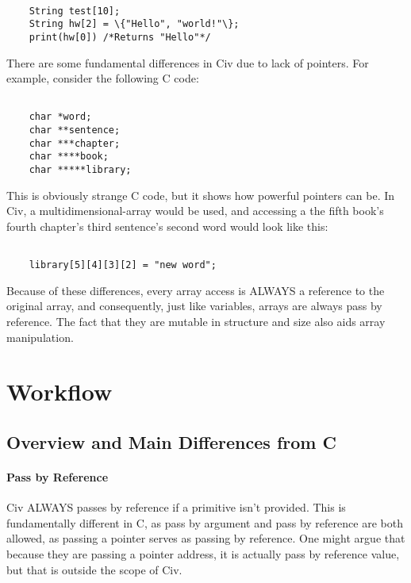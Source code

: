 \documentclass[a4paper]{article}
\begin{document}
{\selectfont
\begin{lstlisting}

	String test[10];
	String hw[2] = \{"Hello", "world!"\};
	print(hw[0]) /*Returns "Hello"*/
\end{lstlisting} 
} 

There are some fundamental differences in Civ due to lack of pointers. For example, consider the following C code:

{\selectfont
\begin{lstlisting}

	char *word;
	char **sentence;
	char ***chapter;
	char ****book;
	char *****library;
\end{lstlisting}
} 

This is obviously strange C code, but it shows how powerful pointers can be. In Civ, a multidimensional-array would be used, and accessing a the fifth book's fourth chapter's third sentence's second word would look like this:

{\selectfont
\begin{lstlisting}

	library[5][4][3][2] = "new word";
\end{lstlisting}
} 

Because of these differences, every array access is ALWAYS a reference to the original array, and consequently, just like variables, arrays are always pass by reference. The fact that they are mutable in structure and size also aids array manipulation.

\section{Workflow}
\subsection{Overview and Main Differences from C}

\paragraph{Pass by Reference}
Civ ALWAYS passes by reference if a primitive isn't provided. This is fundamentally different in C, as pass by argument and pass by reference are both allowed, as passing a pointer serves as passing by reference. One might argue that because they are passing a pointer address, it is actually pass by reference value, but that is outside the scope of Civ.
\end{document}
